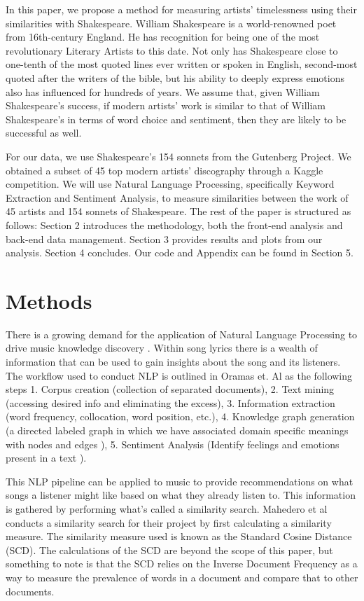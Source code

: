 \documentclass[10pt,a4paper]{article}
\begin{document}
\noindent In this paper, we propose a method for measuring artists’ timelessness using their similarities with Shakespeare. William Shakespeare is a world-renowned poet from 16th-century England. He has recognition for being one of the most revolutionary Literary Artists to this date. Not only has Shakespeare close to one-tenth of the most quoted lines ever written or spoken in English, second-most quoted after the writers of the bible, but his ability to deeply express emotions also has influenced for hundreds of years.\cite{shakeFacts} We assume that, given William Shakespeare’s success, if modern artists’ work is similar to that of William Shakespeare’s in terms of word choice and sentiment, then they are likely to be successful as well.

\noindent For our data, we use Shakespeare's 154 sonnets from the Gutenberg Project. \cite{sonnetsData} We obtained a subset of 45 top modern artists’ discography through a Kaggle competition. We will use Natural Language Processing, specifically Keyword Extraction and Sentiment Analysis, to measure similarities between the work of 45 artists and 154 sonnets of Shakespeare. The rest of the paper is structured as follows: Section 2 introduces the methodology, both the front-end analysis and back-end data management. Section 3 provides results and plots from our analysis. Section 4 concludes. Our code and Appendix can be found in Section 5. 

\section{Methods}
There is a growing demand for the application of Natural Language Processing to drive music knowledge discovery \cite{NLP-for-lyrics}. Within song lyrics there is a wealth of information that can be used to gain insights about the song and its listeners. The workflow used to conduct NLP is outlined in Oramas et. Al \cite{NLP-for-music} as the following steps 1. Corpus creation (collection of separated documents), 2. Text mining (accessing desired info and eliminating the excess), 3. Information extraction (word frequency, collocation, word position, etc.), 4. Knowledge graph generation (a directed labeled graph in which we have associated domain specific meanings with nodes and edges \cite{knowledge-graphs}), 5. Sentiment Analysis (Identify feelings and emotions present in a text \cite{monkey}).
 
\noindent This NLP pipeline can be applied to music to provide recommendations on what songs a listener might like based on what they already listen to. \cite{NLP-for-lyrics} This information is gathered by performing what’s called a similarity search. Mahedero et al \cite{NLP-for-lyrics} conducts a similarity search for their project by first calculating a similarity measure. The similarity measure used is known as the Standard Cosine Distance (SCD). The calculations of the SCD are beyond the scope of this paper, but something to note is that the SCD relies on the Inverse Document Frequency as a way to measure the prevalence of words in a document and compare that to other documents. 
\end{document}
